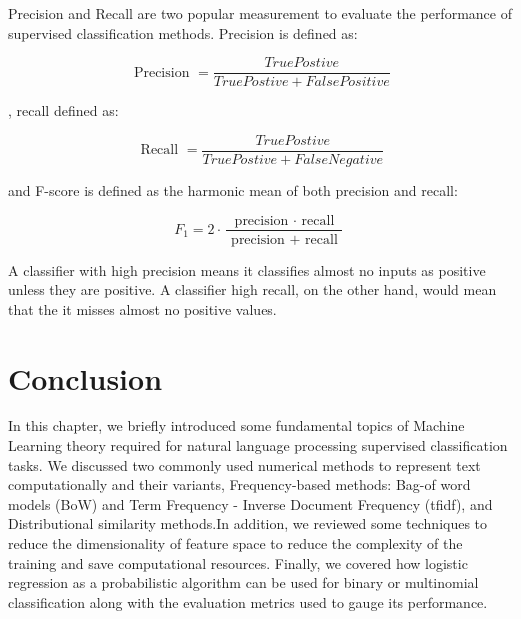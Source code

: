 Precision and Recall are two popular measurement to evaluate the performance of supervised classification methods. Precision is defined as:

$$\text { Precision } = \frac { True Postive } { True Postive + False Positive }$$

, recall defined as:

$$\text { Recall } = \frac { True Postive } { True Postive + False Negative }$$

and F-score is defined as the harmonic mean of both precision and recall:

$$F _ { 1 } = 2 \cdot \frac { \text { precision } \cdot \text { recall } } { \text { precision } + \text { recall } }$$

A classifier with high precision means it classifies almost no inputs as positive unless they are positive. A classifier high recall, on the other hand, would mean that the it misses almost no positive values. 
\section{Conclusion}

In this chapter, we briefly introduced some fundamental topics of Machine Learning theory required for natural language processing supervised classification tasks. We discussed two commonly used numerical methods to represent text computationally and their variants, Frequency-based methods: Bag-of word models (BoW) and Term Frequency - Inverse Document Frequency (tfidf), and Distributional similarity methods.In addition, we reviewed some techniques to reduce the dimensionality of feature space to reduce the complexity of the training and save computational resources. Finally, we covered how logistic regression as a probabilistic algorithm can be used for binary or multinomial classification along with the evaluation metrics used to  gauge its performance.